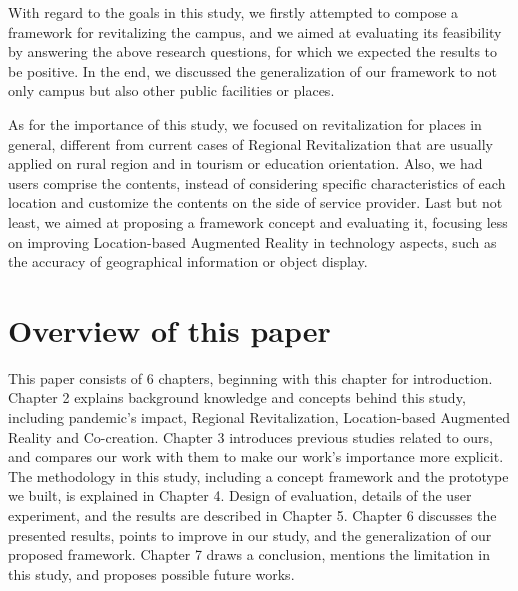 
With regard to the goals in this study, we firstly attempted to compose a framework for revitalizing the campus, and we aimed at evaluating its feasibility by answering the above research questions, for which we expected the results to be positive.
In the end, we discussed the generalization of our framework to not only campus but also other public facilities or places.


As for the importance of this study, we focused on revitalization for places in general, different from current cases of Regional Revitalization that are usually applied on rural region and in tourism or education orientation.
Also, we had users comprise the contents, instead of considering specific characteristics of each location and customize the contents on the side of service provider.
Last but not least, we aimed at proposing a framework concept and evaluating it, focusing less on improving Location-based Augmented Reality in technology aspects, such as the accuracy of geographical information or object display.

\section{Overview of this paper}
This paper consists of 6 chapters, beginning with this chapter for introduction.
Chapter 2 explains background knowledge and concepts behind this study, including pandemic's impact, Regional Revitalization, Location-based Augmented Reality and Co-creation.
Chapter 3 introduces previous studies related to ours, and compares our work with them to make our work's importance more explicit.
The methodology in this study, including a concept framework and the prototype we built, is explained in Chapter 4. 
Design of evaluation, details of the user experiment, and the results are described in Chapter 5.
Chapter 6 discusses the presented results, points to improve in our study, and the generalization of our proposed framework.
Chapter 7 draws a conclusion, mentions the limitation in this study, and proposes possible future works.
